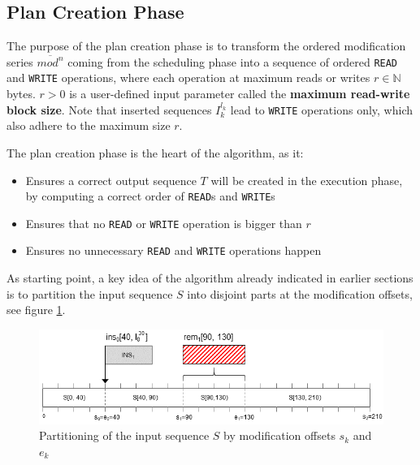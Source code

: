 \documentclass[english, 10pt, openright, twocolumn, landscape, twoside, notitlepage, a4paper, pdftex]		
{article}
\begin{document}
\subsection{Plan Creation Phase}%
\label{sec:PlanCreationPhase}%

The purpose of the plan creation phase is to transform the ordered modification series $\overline{mod^{n}}$ coming from the scheduling phase into a sequence of ordered \texttt{READ} and \texttt{WRITE} operations, where each operation at maximum reads or writes $r\in\mathbb{N}$ bytes. $r>0$ is a user-defined input parameter called the \textbf{maximum read-write block size}. Note that inserted sequences $I_{k}^{l_{k}}$ lead to \texttt{WRITE} operations only, which also adhere to the maximum size $r$.

The plan creation phase is the heart of the algorithm, as it:
\begin{itemize}
\item Ensures a correct output sequence $T$ will be created in the execution phase, by computing a correct order of \texttt{READ}s and \texttt{WRITE}s
\item Ensures that no \texttt{READ} or \texttt{WRITE} operation is bigger than $r$
\item Ensures no unnecessary \texttt{READ} and \texttt{WRITE} operations happen
\end{itemize}

As starting point, a key idea of the algorithm already indicated in earlier sections is to partition the input sequence $S$ into disjoint parts at the modification offsets, see figure \ref{fig:Key}.

\begin{figure}[htbp]
\centering
\includegraphics[width=1.00\columnwidth]{figures/Key.png}
\caption{Partitioning of the input sequence $S$ by modification offsets $s_{k}$ and $e_{k}$}
\label{fig:Key}
\end{figure}
\end{document}
